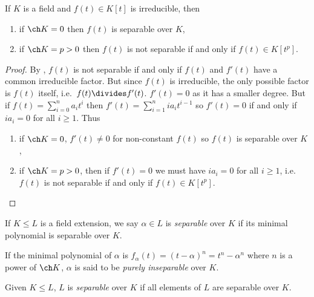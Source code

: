 \documentclass[a4paper]{article}
\begin{document}
\begin{corollary}
  If \(K\) is a field and \(f(t) \in K[t]\) is irreducible, then
  \begin{enumerate}
  \item if \(\ch K = 0\) then \(f(t)\) is separable over \(K\),
  \item if \(\ch K = p > 0\) then \(f(t)\) is not separable if and only if \(f(t) \in K[t^p]\).
  \end{enumerate}
\end{corollary}

\begin{proof}
  By , \(f(t)\) is not separable if and only if \(f(t)\) and \(f'(t)\) have a common irreducible factor. But since \(f(t)\) is irreducible, the only possible factor is \(f(t)\) itself, i.e.\ \(f(t) \divides f'(t)\). \(f'(t) = 0\) as it has a smaller degree. But if \(f(t) = \sum_{i = 0}^{n} a_it^i\) then \(f'(t) = \sum_{i = 1}^{n} ia_it^{i - 1}\) so \(f'(t) = 0\) if and only if \(ia_i = 0\) for all \(i \geq 1\). Thus
  \begin{enumerate}
  \item if \(\ch K = 0\), \(f'(t) \neq 0\) for non-constant \(f(t)\) so \(f(t)\) is separable over \(K\),
  \item if \(\ch K = p > 0\), then if \(f'(t) = 0\) we must have \(ia_i = 0\) for all \(i \geq 1\), i.e.\ \(f(t)\) is not separable if and only if \(f(t) \in K[t^p]\).
  \end{enumerate}
\end{proof}

\begin{definition}
  If \(K \leq L\) is a field extension, we say \(\alpha \in L\) is \emph{separable} over \(K\) if its minimal polynomial is separable over \(K\).
\end{definition}

\begin{definition}
  If the minimal polynomial of \(\alpha\) is \(f_\alpha(t) = (t - \alpha)^n = t^n - \alpha^n\) where \(n\) is a power of \(\ch K\), \(\alpha\) is said to be \emph{purely inseparable} over \(K\).
\end{definition}

\begin{definition}
  Given \(K \leq L\), \(L\) is \emph{separable} over \(K\) if all elements of \(L\) are separable over \(K\).
\end{definition}
\end{document}
